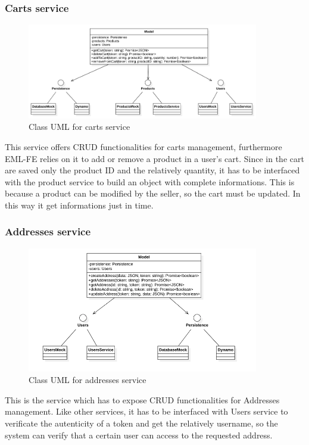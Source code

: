 \subsubsection{Carts service}
\begin{figure}[H]
    \includegraphics[width=0.9\textwidth]{res/images/class-diagrams/carts.png}
    \caption{Class UML for carts service}
\end{figure}
This service offers CRUD functionalities for carts management, furthermore EML-FE relies on it to add or remove a product in a user's cart.
Since in the cart are saved only the product ID and the relatively quantity, it has to be interfaced with the product service to build an object with complete informations.
This is because a product can be modified by the seller, so the cart must be updated. In this way it get informations just in time.

\subsubsection{Addresses service}
\begin{figure}[H]
    \includegraphics[width=0.9\textwidth]{res/images/class-diagrams/addresses.png}
    \caption{Class UML for addresses service}
\end{figure}
This is the service which has to expose CRUD functionalities for Addresses management. Like other services, it has to be interfaced with Users service to verificate the
autenticity of a token and get the relatively username, so the system can verify that a certain user can access to the requested address. 

